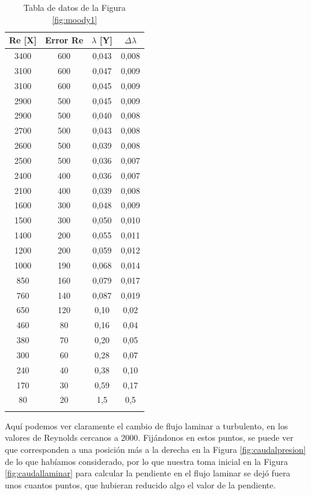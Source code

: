 \documentclass[a4paper,12pt,spanish]{article}
\begin{document}
\begin{longtable}[c]{|c|c|c|c|}
	
	
	\hline
	Re [X] & Error Re & $\lambda$ [Y] & $\Delta \lambda$\\ \hline\hline
	\endfirsthead
	\endhead
	3400 & 600 & 0,043 & 0,008 \\ \hline
	3100 & 600 & 0,047 & 0,009 \\ \hline
	3100 & 600 & 0,045 & 0,009 \\ \hline
	2900 & 500 & 0,045 & 0,009 \\ \hline
	2900 & 500 & 0,040 & 0,008 \\ \hline
	2700 & 500 & 0,043 & 0,008 \\ \hline
	2600 & 500 & 0,039 & 0,008 \\ \hline
	2500 & 500 & 0,036 & 0,007 \\ \hline
	2400 & 400 & 0,036 & 0,007 \\ \hline
	2100 & 400 & 0,039 & 0,008 \\ \hline
	1600 & 300 & 0,048 & 0,009 \\ \hline
	1500 & 300 & 0,050 & 0,010 \\ \hline
	1400 & 200 & 0,055 & 0,011 \\ \hline
	1200 & 200 & 0,059 & 0,012 \\ \hline
	1000 & 190 & 0,068 & 0,014 \\ \hline
	850 & 160 & 0,079 & 0,017 \\ \hline
	760 & 140 & 0,087 & 0,019 \\ \hline
	650 & 120 & 0,10 & 0,02 \\ \hline
	460 & 80 & 0,16 & 0,04 \\ \hline
	380 & 70 & 0,20 & 0,05 \\ \hline
	300 & 60 & 0,28 & 0,07 \\ \hline
	240 & 40 & 0,38 & 0,10 \\ \hline
	170 & 30 & 0,59 & 0,17 \\ \hline
	80 & 20 & 1,5 & 0,5 \\ \hline
	
	\caption{Tabla de datos de la Figura \ref{fig:moody1}}
\end{longtable}



	
	
	Aquí podemos ver claramente el cambio de flujo laminar a turbulento, en los valores de Reynolds cercanos a 2000. Fijándonos en estos puntos, se puede ver que corresponden a una posición más a la derecha en la Figura \ref{fig:caudalpresion} de lo que habíamos considerado, por lo que nuestra toma inicial en la Figura \ref{fig:caudallaminar} para calcular la pendiente en el flujo laminar se dejó fuera unos cuantos puntos, que hubieran reducido algo el valor de la pendiente.
	
\end{document}
